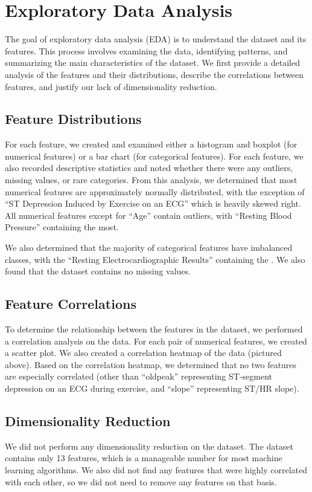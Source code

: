 \section{Exploratory Data Analysis}

The goal of exploratory data analysis (EDA) is to understand the dataset and its features. This process involves examining the data, identifying patterns, and summarizing the main characteristics of the dataset. We first provide a detailed analysis of the features and their distributions, describe the correlations between features, and justify our lack of dimensionality reduction.

\subsection{Feature Distributions}
For each feature, we created and examined either a histogram and boxplot (for numerical features) or a bar chart (for categorical features). For each feature, we also recorded descriptive statistics and noted whether there were any outliers, missing values, or rare categories. 
From this analysis, we determined that most numerical features are approximately normally distributed, with the exception of ``ST Depression Induced by Exercise on an ECG'' which is heavily skewed right. All numerical features except for ``Age'' contain outliers, with ``Resting Blood Pressure'' containing the most. 

We also determined that the majority of categorical features have imbalanced classes, with the ``Resting Electrocardiographic Results'' containing the . We also found that the dataset contains no missing values.

\subsection{Feature Correlations}
To determine the relationship between the features in the dataset, we performed a correlation analysis on the data. For each pair of numerical features, we created a scatter plot. We also created a correlation heatmap of the data (pictured above). Based on the correlation heatmap, we determined that no two features are especially correlated (other than ``oldpeak'' representing ST-segment depression on an ECG during exercise, and ``slope'' representing ST/HR slope).

\subsection{Dimensionality Reduction}
We did not perform any dimensionality reduction on the dataset. The dataset contains only 13 features, which is a manageable number for most machine learning algorithms. We also did not find any features that were highly correlated with each other, so we did not need to remove any features on that basis.